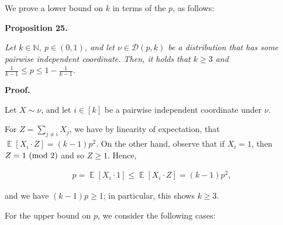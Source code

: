 \documentclass[10pt,a4paper]{article}
\begin{document}
We prove a lower bound on $k$ in terms of the $p$, as follows:\par





\par\medskip\noindent\textbf{
\textbf{Proposition 25}\textbf{.}
}\par



\emph{Let $k\in\mathbb{N},\ p\in(0,1)$, and let $\nu\in\mathcal{D}(p,k)$ be a distribution that has some pairwise independent coordinate.
Then, it holds that $k\geqslant 3$ and $\frac{1}{k-1}\leqslant p\leqslant 1-\frac{1}{k-1}$.}\par






\par\medskip\noindent\textbf{Proof.}\par




Let $X\sim\nu$, and let $i\in[k]$ be a pairwise independent coordinate under $\nu$.\par




For $Z=\sum_{j\not=i}X_{j}$, we have by linearity of expectation, that $\mathop{\mathbb{E}}\left[X_{i}\cdot Z\right]=(k-1)p^{2}$.
On the other hand, observe that if $X_{i}=1$, then $Z=1\textnormal{ (mod 2)}$ and so $Z\geqslant 1$.
Hence,\par


\[\begin{gathered}
p=\mathop{\mathbb{E}}\left[X_{i}\cdot 1\right]\leqslant\mathop{\mathbb{E}}\left[X_{i}\cdot Z\right]=(k-1)p^{2},
\end{gathered}\]


and we have $(k-1)p\geqslant 1$; in particular, this shows $k\geqslant 3$.\par





For the upper bound on $p$, we consider the following cases:\par
\end{document}
